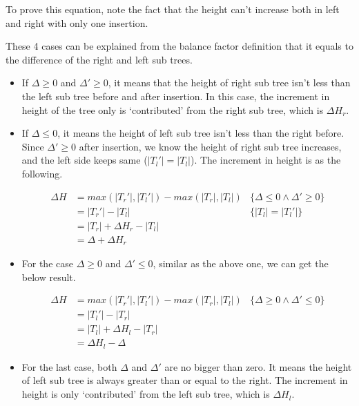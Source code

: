 \documentclass{article}
\begin{document}
To prove this equation, note the fact that the height can't increase
both in left and right with only one insertion.

These 4 cases can be explained from the balance factor
definition that it equals to the difference of the right and left sub trees.

\begin{itemize}
\item If $\Delta \geq 0$ and $\Delta' \geq 0$, it means that the height
of right sub tree isn't less than the left sub tree
before and after insertion. In this case, the increment in
height of the tree only is `contributed' from the right sub tree, which
is $\Delta H_r$.

\item If $\Delta \leq 0$, it means the height of left sub tree isn't
less than the right before. Since $\Delta' \geq 0$ after insertion,
we know the height of right sub tree increases,
and the left side keeps same ($|T_l'|=|T_l|$). The increment in height is
as the following.

\[
\begin{array}{rll}
\Delta H & = max(|T_r'|, |T_l'|) - max (|T_r|, |T_l|) & \{\Delta \leq 0 \land \Delta' \geq 0 \}\\
         & = |T_r'|-|T_l| & \{|T_l|=|T_l'| \}\\
         & = |T_r|+\Delta H_r - |T_l| & \\
         & = \Delta + \Delta H_r &
\end{array}
\]

\item For the case $\Delta \geq 0$ and $\Delta' \leq 0$, similar as the
above one, we can get the below result.

\[
\begin{array}{rll}
\Delta H & = max(|T_r'|, |T_l'|) - max (|T_r|, |T_l|) & \{\Delta \geq 0 \land \Delta' \leq 0 \}\\
         & = |T_l'|-|T_r| & \\
         & = |T_l|+\Delta H_l - |T_r| & \\
         & = \Delta H_l - \Delta&
\end{array}
\]

\item For the last case, both $\Delta$ and $\Delta'$ are no bigger than
zero. It means the height of left sub tree is always greater than or equal
 to the right. The increment in height is only `contributed'
from the left sub tree, which is $\Delta H_l$.
\end{itemize}
\end{document}
